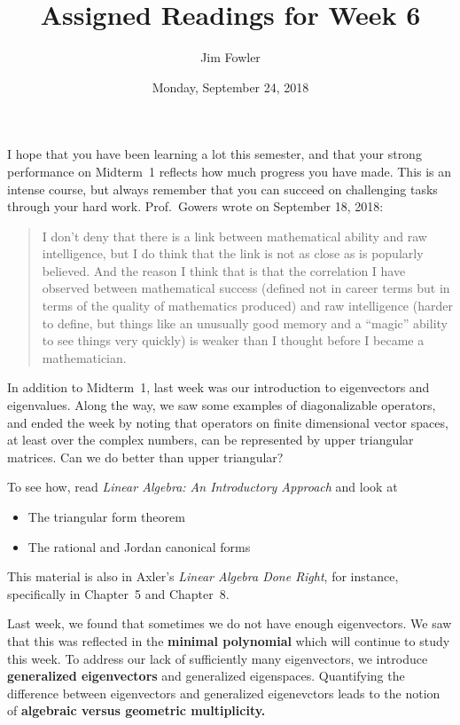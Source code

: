 \documentclass{homework}
\author{Jim Fowler}
\title{Assigned Readings for Week 6}
\date{Monday, September 24, 2018}
\begin{document}
\maketitle

I hope that you have been learning a lot this semester, and that your
strong performance on Midterm~1 reflects how much progress you have
made.  This is an intense course, but always remember that you can
succeed on challenging tasks through your hard work.  Prof.~Gowers
wrote on September 18, 2018:
\begin{quote}
  I don't deny that there is a link between mathematical ability and
  raw intelligence, but I do think that the link is not as close as is
  popularly believed. And the reason I think that is that the
  correlation I have observed between mathematical success (defined
  not in career terms but in terms of the quality of mathematics
  produced) and raw intelligence (harder to define, but things like an
  unusually good memory and a ``magic'' ability to see things very
  quickly) is weaker than I thought before I became a mathematician.
\end{quote}
In addition to Midterm~1, last week was our introduction to
eigenvectors and eigenvalues.  Along the way, we saw some examples of
diagonalizable operators, and ended the week by noting that operators
on finite dimensional vector spaces, at least over the complex
numbers, can be represented by upper triangular matrices.  Can we do
better than upper triangular?

To see how, read \textit{Linear Algebra: An Introductory Approach} and
look at
\begin{itemize}
\item {} The triangular form theorem
\item {} The rational and Jordan canonical forms
\end{itemize}
This material is also in Axler's \textit{Linear Algebra Done Right},
for instance, specifically in Chapter~5 and Chapter~8.

Last week, we found that sometimes we do not have enough eigenvectors.
We saw that this was reflected in the \textbf{minimal polynomial}
which will continue to study this week.  To address our lack of
sufficiently many eigenvectors, we introduce \textbf{generalized
  eigenvectors} and generalized eigenspaces.  Quantifying the
difference between eigenvectors and generalized eigenevctors leads to
the notion of \textbf{algebraic versus geometric multiplicity.}
\end{document}
